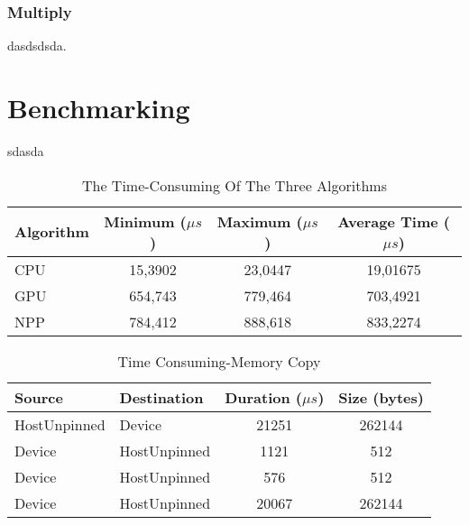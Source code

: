 \documentclass[11pt]{article} %
\begin{document}
		\subsubsection{Multiply}  dasdsdsda. 
\section{Benchmarking}

	\justifying  sdasda \\
	
	\begin{table}[H] %
		\caption[The Time-Consuming Of The Three Algorithms]{ The Time-Consuming Of The Three Algorithms }
		\label{tab:table_1}	
		\begin{tabular}{l c c c}
			Algorithm & Minimum ($\mu s$) & Maximum ($\mu s$) & Average Time ($\mu s$) \\ \hline\hline 
			CPU &	15,3902	&	23,0447	&	19,01675 \\ \hline
			GPU & 	654,743	&	779,464	&	703,4921\\ \hline
			NPP & 	784,412	&	888,618	&	833,2274   \\  \hline
		\end{tabular}
		\centering	

	\end{table}

	\begin{table}[htbp]
		\centering
		\caption{Time Consuming-Memory Copy}
		\label{tab:table_2}%
		\begin{tabular}{llc c}
			Source & Destination & \multicolumn{1}{l}{Duration ($\mu s$)} & \multicolumn{1}{l}{Size (bytes)} \\\hline \hline 
			HostUnpinned & Device & 21251 & 262144 \\ \hline
			Device & HostUnpinned & 1121  & 512 \\\hline
			Device & HostUnpinned & 576   & 512 \\\hline
			Device & HostUnpinned & 20067 & 262144 \\\hline
		\end{tabular}%
	\end{table}%
\end{document}
